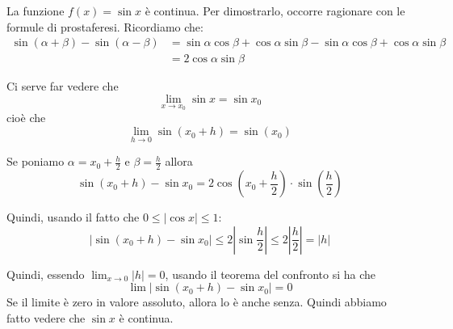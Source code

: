 \begin{example}
La funzione $f(x) = \sin x$ è continua. Per dimostrarlo, occorre ragionare con le formule di prostaferesi. Ricordiamo che:
\begin{align*}
\sin(\alpha + \beta) - \sin (\alpha - \beta) &= \sin \alpha \cos \beta + \cos \alpha \sin \beta - \sin \alpha \cos \beta + \cos \alpha \sin \beta \\
&= 2\cos \alpha \sin \beta
\end{align*}

Ci serve far vedere che
\begin{equation*}
\lim_{x \to x_0} \sin x = \sin x_0
\end{equation*}
cioè che 
\begin{equation*}
\lim_{h \to 0} \sin(x_0 + h) = \sin (x_0)
\end{equation*}

Se poniamo $\alpha = x_0 + \frac{h}{2}$ e $\beta = \frac{h}{2}$ allora
\begin{equation*}
\sin (x_0 + h) - \sin x_0 = 2 \cos \left(x_0 + \frac{h}{2}\right) \cdot \sin \left(\frac{h}{2}\right)
\end{equation*}

Quindi, usando il fatto che $0 \le |\cos x| \le 1$:
\begin{equation*}
|\sin(x_0+h)-\sin x_0| \le 2\left\lvert \sin \frac{h}{2} \right\rvert \le 2 \left\lvert\frac{h}{2}\right\rvert= |h|
\end{equation*}

Quindi, essendo $\lim_{x \to 0} |h| = 0$, usando il teorema del confronto si ha che
\begin{equation*}
\lim |\sin(x_0+h)-\sin x_0| = 0
\end{equation*}
Se il limite è zero in valore assoluto, allora lo è anche senza. Quindi abbiamo fatto vedere che $\sin x$ è continua.
\end{example}

